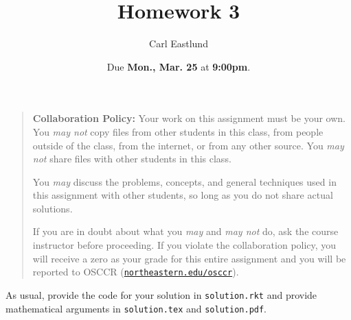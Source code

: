 \documentclass{article}
\title{Homework 3}
\author{Carl Eastlund}
\date{Due \textbf{Mon., Mar. 25} at \textbf{9:00pm}.}
\begin{document}
\maketitle

\newcommand\link[2][http://]{\href{#1#2}{\nolinkurl{#2}}}
\newcommand\http[1]{\link[http://]{#1}}
\newcommand\https[1]{\link[https://]{#1}}
\newcommand\email[1]{\link[mailto:]{#1}}

\begin{quotation}

  \noindent \textbf{Collaboration Policy:} Your work on this assignment must be
  your own.  You \emph{may not} copy files from other students in this class,
  from people outside of the class, from the internet, or from any other source.
  You \emph{may not} share files with other students in this class.

  \medskip

  \noindent You \emph{may} discuss the problems, concepts, and general
  techniques used in this assignment with other students, so long as you do not
  share actual solutions.

  \medskip

  \noindent If you are in doubt about what you \emph{may} and \emph{may not} do,
  ask the course instructor before proceeding.  If you violate the collaboration
  policy, you will receive a zero as your grade for this entire assignment and
  you will be reported to OSCCR (\link{northeastern.edu/osccr}).

\end{quotation}

\bigskip

\newcommand\file\texttt
\newcommand\code\texttt

\noindent
As usual, provide the code for your solution in \file{solution.rkt} and provide
mathematical arguments in \file{solution.tex} and \file{solution.pdf}.

\bigskip
\end{document}
